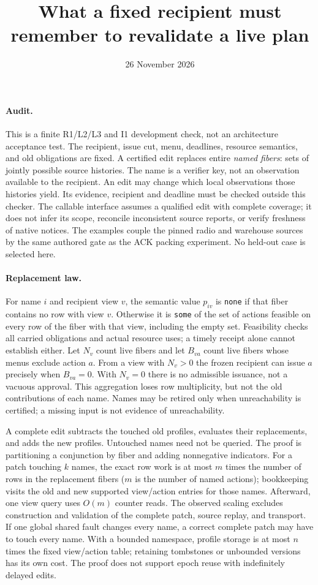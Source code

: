 \documentclass{article}
\title{What a fixed recipient must remember to revalidate a live plan}
\author{}
\date{26 November 2026}
\begin{document}
\maketitle

\paragraph{Audit.}
This is a finite R1/L2/L3 and I1 development check, not an architecture acceptance test.
The recipient, issue cut, menu, deadlines, resource semantics, and old obligations are fixed.
A certified edit replaces entire \emph{named fibers}: sets of jointly possible source histories.
The name is a verifier key, not an observation available to the recipient.
An edit may change which local observations those histories yield.
Its evidence, recipient and deadline must be checked outside this checker.
The callable interface assumes a qualified edit with complete coverage; it does not infer its
scope, reconcile inconsistent source reports, or verify freshness of native notices.
The examples couple the pinned radio and warehouse sources by the same authored gate
as the ACK packing experiment. No held-out case is selected here.

\paragraph{Replacement law.}
For name $i$ and recipient view $v$, the semantic value
$p_{iv}$ is \texttt{none} if that fiber contains no row with view $v$.
Otherwise it is \texttt{some} of the set of actions feasible on every row of the fiber
with that view, including the empty set. Feasibility checks all carried obligations
and actual resource uses; a timely receipt alone cannot establish either.
Let $N_v$ count live fibers and let $B_{va}$ count live fibers whose menus exclude
action $a$. From a view with $N_v>0$ the frozen recipient can issue $a$ precisely when
$B_{va}=0$. With $N_v=0$ there is no admissible issuance, not a vacuous approval.
This aggregation loses row multiplicity, but not the old contributions of
each name. Names may be retired only when unreachability is certified; a missing
input is not evidence of unreachability.

A complete edit subtracts the touched old profiles, evaluates their replacements,
and adds the new profiles. Untouched names need not be queried.
The proof is partitioning a conjunction by fiber and adding
nonnegative indicators. For a patch touching $k$ names, the exact row work
is at most $m$ times the number of rows in the replacement fibers ($m$ is the
number of named actions); bookkeeping visits the old and new supported
view/action entries for those names. Afterward, one view query uses $O(m)$
counter reads. The observed scaling excludes construction and validation of the
complete patch, source replay, and transport. If one global shared fault changes
every name, a correct complete patch may have to touch every name.
With a bounded namespace, profile storage is at most $n$ times the fixed
view/action table; retaining tombstones or unbounded versions has its own
cost. The proof does not support epoch reuse with indefinitely delayed edits.
\end{document}
